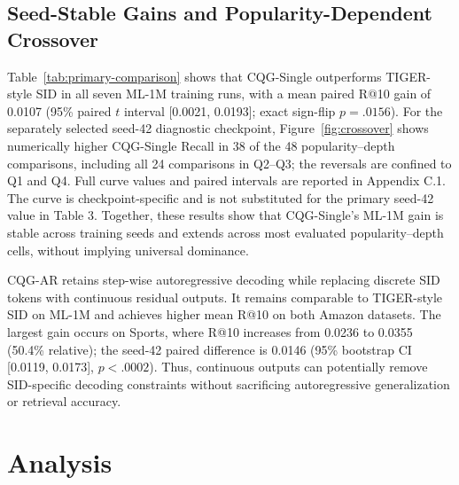 \documentclass[preprint,12pt]{elsarticle}
\begin{document}


\subsection{Seed-Stable Gains and Popularity-Dependent Crossover}

Table~\ref{tab:primary-comparison} shows that CQG-Single outperforms
TIGER-style SID in all seven ML-1M training runs, with a mean paired R@10
gain of 0.0107 (95\% paired $t$ interval [0.0021, 0.0193]; exact sign-flip
$p=.0156$). For the separately selected seed-42 diagnostic checkpoint,
Figure~\ref{fig:crossover} shows numerically higher
CQG-Single Recall in 38 of the 48 popularity--depth comparisons, including
all 24 comparisons in Q2--Q3; the reversals are confined to Q1 and Q4.
Full curve values and paired intervals are reported in Appendix C.1. The
curve is checkpoint-specific and is not substituted for the primary
seed-42 value in Table 3. Together, these results show that CQG-Single's
ML-1M gain is stable across training seeds and extends across most evaluated
popularity--depth cells, without implying universal dominance.

CQG-AR retains step-wise autoregressive decoding while replacing discrete
SID tokens with continuous residual outputs. It remains comparable to
TIGER-style SID on ML-1M and achieves higher mean R@10 on both Amazon
datasets. The largest gain occurs on Sports, where R@10 increases from
0.0236 to 0.0355 (50.4\% relative); the seed-42 paired difference is 0.0146
(95\% bootstrap CI [0.0119, 0.0173], $p<.0002$). Thus, continuous outputs
can potentially remove SID-specific decoding constraints without sacrificing
autoregressive generalization or retrieval accuracy.

\section{Analysis}
\end{document}
